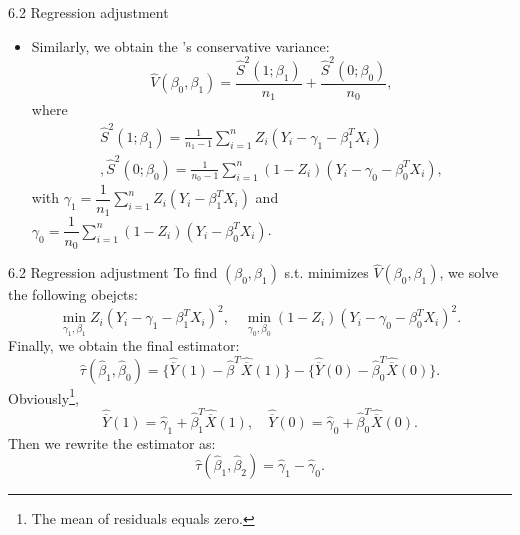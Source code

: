\documentclass[aspectratio=169, 12pt]{beamer}
\begin{document}
\begin{frame}{6.2 Regression adjustment}
  \begin{itemize}
    \item Similarly, we obtain the \citet{neyman1923application}'s conservative variance:
    \[
    \widehat{V}(\beta_0,\beta_1)=\frac{\widehat{S}^2(1;\beta_1)}{n_1}+\frac{\widehat{S}^2(0;\beta_0)}{n_0},
    \]
    where
    \begin{gather*}
      \widehat{S}^2(1;\beta_1)=\frac{1}{n_1-1}\sum_{i=1}^{n}Z_i(Y_i-\gamma_1-\beta_1^TX_i)\\,
      \widehat{S}^2(0;\beta_0) = \frac{1}{n_0-1}\sum_{i=1}^{n}(1-Z_i)(Y_i-\gamma_0-\beta_0^TX_i),
    \end{gather*}
    with $\gamma_1=\dfrac{1}{n_1}\sum_{i=1}^{n}Z_i(Y_i-\beta_1^TX_i)$ and $\gamma_0=\dfrac{1}{n_0}\sum_{i=1}^{n}(1-Z_i)(Y_i-\beta_0^TX_i)$.
  \end{itemize}
\end{frame}

\begin{frame}{6.2 Regression adjustment}
  To find $(\beta_0,\beta_1)$ s.t. minimizes $\widehat{V}(\beta_0,\beta_1)$, we solve the following obejcts:
  \[
  \min_{\gamma_1,\beta_1}Z_i(Y_i-\gamma_1-\beta_1^TX_i)^2,\quad \min_{\gamma_0,\beta_0}(1-Z_i)(Y_i-\gamma_0-\beta_0^TX_i)^2.
  \]
  Finally, we obtain the final estimator:
  \[
  \widehat{\tau}(\widehat{\beta}_1,\widehat{\beta}_0)
  = \{
    \widehat{\overline{Y}}(1)-\widehat{\beta}^T\widehat{\overline{X}}(1)
  \}
  -
  \{
    \widehat{\overline{Y}}(0)-\widehat{\beta}_0^T\widehat{\overline{X}}(0)
  \}.
  \]
  Obviously\footnote{The mean of residuals equals zero.},
  \begin{equation}
  \widehat{\overline{Y}}(1)=\widehat{\gamma}_1+\widehat{\beta}_1^T\widehat{\overline{X}}(1),\quad \widehat{\overline{Y}}(0)=\widehat{\gamma}_0+\widehat{\beta}_0^T\widehat{\overline{X}}(0).
  \label{eq:6.3}
  \end{equation}
  Then we rewrite the estimator as:
  \begin{equation}
    \widehat{\tau}(\widehat{\beta}_1,\widehat{\beta}_2)=\widehat{\gamma}_1-\widehat{\gamma}_0.
    \label{eq:6.4}
  \end{equation}
\end{frame}
\end{document}
